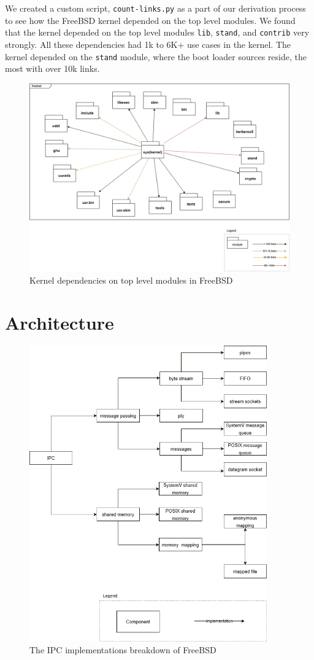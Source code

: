 \documentclass[12pt, dvipsnames, a4paper]{article}
\newcommand{\code}[1]{\texttt{#1}}
\begin{document}
We created a custom script, \code{count-links.py} as a part of our derivation process to see how the FreeBSD kernel depended on the top level modules. We found that the kernel depended on the top level modules \code{lib}, \code{stand}, and \code{contrib} very strongly. All these dependencies had 1k to 6K+ use cases in the kernel. The kernel depended on the \code{stand} module, where the boot loader sources reside, the most with over 10k links.
\begin{figure}[!htb]
	\center
	\includegraphics[width = 390pt]{assets/kernel-dependencies.png}
	\caption{Kernel dependencies on top level modules in FreeBSD}
\end{figure}
\clearpage
\section{Architecture}
\begin{figure}[!htb]
	\center
	\includegraphics[width = 290pt]{assets/ipc-implementations.png}
	\caption{The IPC implementations breakdown of FreeBSD}
\end{figure}
\end{document}
